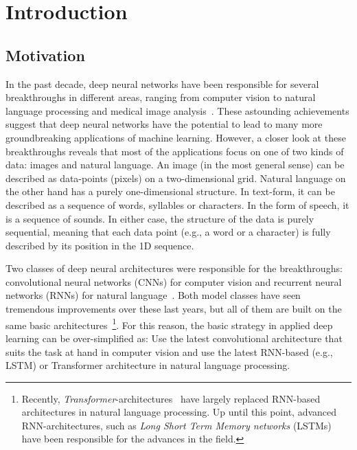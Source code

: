 \chapter{Introduction}
\label{chapter:Introduction}


\section{Motivation}
\label{sec:motivation}

In the past decade, deep neural networks have been responsible for several breakthroughs in different areas, ranging from computer vision to natural language processing and medical image analysis~\cite{Goodfellow-et-al-2016}. These astounding achievements suggest that deep neural networks have the potential to lead to many more groundbreaking applications of machine learning. However, a closer look at these breakthroughs reveals that most of the applications focus on one of two kinds of data: images and natural language. An image (in the most general sense) can be described as data-points (pixels) on a two-dimensional grid. Natural language on the other hand has a purely one-dimensional structure. In text-form, it can be described as a sequence of words, syllables or characters. In the form of speech, it is a sequence of sounds. In either case, the structure of the data is purely sequential, meaning that each data point (e.g., a word or a character) is fully described by its position in the 1D sequence.

Two classes of deep neural architectures were responsible for the breakthroughs: convolutional neural networks (CNNs) for computer vision and recurrent neural networks (RNNs) for natural language~\cite{Goodfellow-et-al-2016}. Both model classes have seen tremendous improvements over these last years, but all of them are built on the same basic architectures~\footnote{Recently, \textit{Transformer}-architectures~\cite{Vaswani2017} have largely replaced RNN-based architectures in natural language processing. Up until this point, advanced RNN-architectures, such as \textit{Long Short Term Memory networks} (LSTMs)~\cite{Hochreiter1997} have been responsible for the advances in the field.}. For this reason, the basic strategy in applied deep learning can be over-simplified as: Use the latest convolutional architecture that suits the task at hand in computer vision and use the latest RNN-based (e.g., LSTM) or Transformer architecture in natural language processing.

